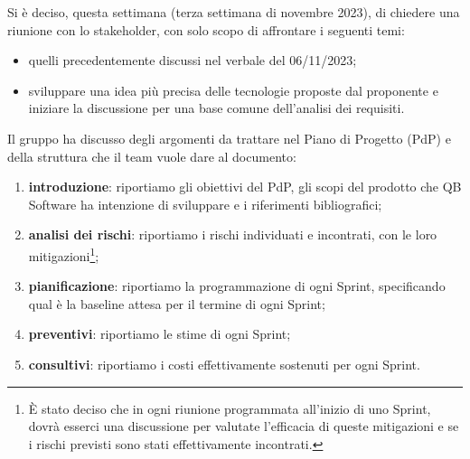 \documentclass[12pt]{article}
\begin{document}
		\noindent
		Si è deciso, questa settimana (terza settimana di novembre 2023), di chiedere una riunione con lo stakeholder, con solo scopo di affrontare i seguenti temi:
		\begin{itemize}
			\item quelli precedentemente discussi nel verbale del 06/11/2023;
			\item sviluppare una idea più precisa delle tecnologie proposte dal proponente e iniziare la discussione per una base comune dell'analisi dei requisiti.
		\end{itemize}
		\noindent
		Il gruppo ha discusso degli argomenti da trattare nel Piano di Progetto (PdP) e della struttura che il team vuole dare al documento:
		\begin{enumerate}
			\item \textbf{introduzione}: riportiamo gli obiettivi del PdP, gli scopi del prodotto che QB Software ha intenzione di sviluppare e i riferimenti bibliografici;
			\item \textbf{analisi dei rischi}: riportiamo i rischi individuati e incontrati, con le loro mitigazioni\footnote{È stato deciso che in ogni riunione programmata all'inizio di uno Sprint, dovrà esserci una discussione per valutate l'efficacia di queste mitigazioni e se i rischi previsti sono stati effettivamente incontrati.};
			\item \textbf{pianificazione}: riportiamo la programmazione di ogni Sprint, specificando qual è la baseline attesa per il termine di ogni Sprint;
			\item \textbf{preventivi}: riportiamo le stime di ogni Sprint;
			\item \textbf{consultivi}: riportiamo i costi effettivamente sostenuti per ogni Sprint.
		\end{enumerate}
		
\end{document}
